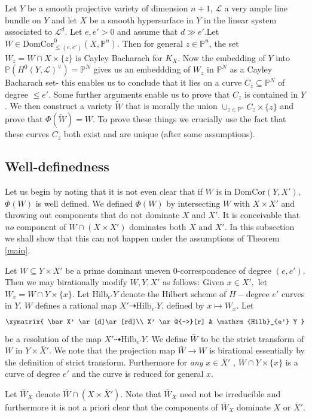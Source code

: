 \documentclass[12pt]{amsart}
\numberwithin{equation}{section}
\numberwithin{theorem}{section}
\theoremstyle{definition}
\theoremstyle{definition}
\def\PP{{\mathbb{P}}}
\def\Lc{{\mathcal{L}}}
\def\dra{{\dashrightarrow}}
\newcommand{\Hilb}{\mathrm{Hilb}}
\def \DC{{\mathrm{DomCor}}}
\begin{document}
Let $Y$ be a smooth projective variety of dimension $n+1$, $\Lc$ a very ample line bundle on $Y$ and let $X$ be a smooth hypersurface in $Y$ in the linear system associated to $\Lc^d.$ Let $e, e' > 0$ and assume that $d \gg e'. $Let $W \in \DC^0_{\le (e,e')} (X, \PP^n)$. Then for general $z \in \PP^n$, the set $W_z = W \cap X \times \{z\}$ is Cayley Bacharach for $K_X$. Now the embedding of $Y$ into $\PP (H^0(Y ,\Lc) ^{\vee}) = \PP^N$ gives us an embeddding of $W_z$ in $\PP^N$ as a Cayley Bacharach set- this enables us to conclude that it lies on a curve $C_z \subseteq \PP^N$ of degree $\le e'$. Some further arguments enable us to prove that $C_z$ is contained in $Y$. We then construct a variety $\tilde W$ that is morally the union  $\cup_{z \in \PP^n} C_z \times \{z\}$ and prove that $\Phi (\tilde W) = W.$ To prove these things we crucially use the fact that these curves $C_z$  both exist and are unique  (after some assumptions).


\subsection{Well-definedness}
Let us begin by noting that it is not even clear that if $W$ is in $\DC(Y,X'), $ $\Phi(W)$ is well defined. We defined $\Phi(W)$ by intersecting $W$ with $X \times X'$ and throwing out components that do not dominate $X$ and $X'$. It is conceivable that \emph{no} component of $ W \cap (X \times X')$ dominates both $X$ and $X'$. In this subsection we shall show that this can not happen under the assumptions of Theorem \ref{main}.

Let $W \subseteq Y \times X'$ be a prime dominant uneven $0$-correspondence of degree $(e,e')$.  Then we may birationally modify $W, Y, X'$ as follows:
    Given $x \in X',$ let $W_x =  W \cap Y \times\{x\}.$
    Let $\Hilb_{e'} Y$ denote the Hilbert scheme of $H-$degree $e'$ curves in $Y$.  $W$ defines a rational map $X'\dra \Hilb_{e'} Y$, defined by $x \mapsto W_x$. Let 
    \[
\xymatrix{
\bar X' \ar[d]\ar[rd]\\
X' \ar@{-->}[r] & \Hilb_{e'} Y
}
\]
be a resolution of the map $ X' \dra \Hilb_{e'} Y.$
    We define $\bar W$ to be the strict transform of $W$ in $ Y \times \bar X'$. 
We note that
      the projection map   $\bar W \to W$ is birational essentially by the definition  of strict transform. Furthermore for \emph {any} $x \in \bar X'$ , $\bar W \cap Y \times \{x\}$ is a curve of degree $e'$ and the curve is reduced for general $x$. 

     Let $\bar W_X$ denote $\bar W \cap (X \times \bar X')$. Note that $\bar W_X$ need not be irreducible and furthermore it is not a priori clear that the components of $\bar W_X$  dominate $X$ or $\bar X'.$
\end{document}

